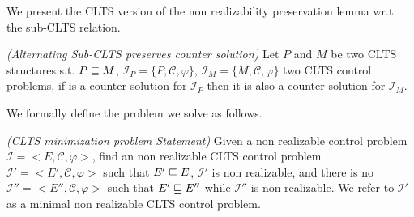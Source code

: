 We present the CLTS version of the non realizability preservation lemma wr.t. the sub-CLTS relation.

\begin{lemma}\emph{(Alternating Sub-CLTS preserves counter solution)}\label{theorem:sub_clts_preserves-non-realizability}
Let $P$ and $M$ be two CLTS structures s.t. $P \sqsubseteq M$, 
$\mathcal{I}_P = \lbrace P, \mathcal{C}, \varphi \rbrace$,
$\mathcal{I}_M = \lbrace M, \mathcal{C}, \varphi \rbrace$
two CLTS control problems, if
 \advCtrl is a counter-solution for $\mathcal{I}_P$ then it is also a counter solution for $\mathcal{I}_M$.
\end{lemma}

We formally define the problem we solve as follows.

\begin{definition}\label{def:clst_ProblemStatement}\emph{(CLTS minimization problem Statement)}
Given a non realizable control problem $\mathcal{I} = <E, \mathcal{C}, \varphi>$, find an non realizable CLTS control problem $\mathcal{I'} = <E', \mathcal{C}, \varphi>$ such that $E' \sqsubseteq E$, $\mathcal{I'}$ is non realizable, and there is no $\mathcal{I''} = <E'', \mathcal{C}, \varphi>$ such that $E' \sqsubseteq E''$ while $\mathcal{I''}$ is non realizable. We refer to $\mathcal{I'}$ as a minimal non realizable CLTS control problem.
\end{definition}

